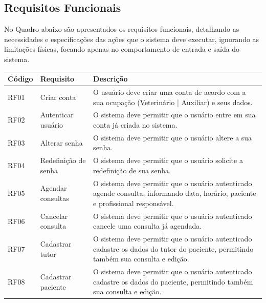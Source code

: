 \documentclass[
    12pt,               %
    openright,          %
    oneside,
    a4paper,            %
    BIBLATEX,           %
    TODO,               %
    english,            %
    brazil              %
    ]{ifsp-spo-inf-ctds}
\begin{document}
        \subsection{Requisitos Funcionais}
        
            No Quadro abaixo são apresentados os requisitos funcionais, detalhando as necessidades e especificações das ações que o sistema deve executar, ignorando as limitações físicas, focando apenas no comportamento de entrada e saída do sistema.
            
            \begin{center}
                \begin{table}[h]
                \centering
                \begin{tabulary}{1.0\textwidth}{|p{5em}|p{8em}|p{18em}|}
                \hline
                Código & Requisito & Descrição\\
                \hline
                RF01 & Criar conta & O usuário deve criar uma conta de acordo com a sua ocupação (Veterinário | Auxiliar) e seus dados.\\
                \hline
                RF02 & Autenticar usuário & O sistema deve permitir que o usuário entre em sua conta já criada no sistema.\\
                \hline
                RF03 & Alterar senha & O sistema deve permitir que o usuário altere a sua senha.\\
                \hline
                RF04 & Redefinição de senha & O sistema deve permitir que o usuário solicite a redefinição de sua senha.\\
                \hline
                RF05 & Agendar consultas & O sistema deve permitir que o usuário autenticado agende consulta, informando data, horário, paciente e profissional responsável.\\
                \hline
                RF06 & Cancelar consulta & O sistema deve permitir que o usuário autenticado cancele uma consulta já agendada.\\
                \hline
                RF07 & Cadastrar tutor & O sistema deve permitir que o usuário autenticado cadastre os dados do tutor do paciente, permitindo também sua consulta e edição.\\
                \hline
                RF08 & Cadastrar paciente & O sistema deve permitir que o usuário autenticado cadastre os dados do paciente, permitindo também sua consulta e edição.\\
                \hline

\end{tabulary}
\end{table}
\end{center}
\end{document}
